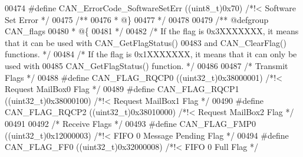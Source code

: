 \begin{DoxyCode}
00474 \textcolor{preprocessor}{#}\textcolor{preprocessor}{define} \textcolor{preprocessor}{CAN\_ErrorCode\_SoftwareSetErr}  \textcolor{preprocessor}{(}\textcolor{preprocessor}{(}\textcolor{preprocessor}{uint8\_t}\textcolor{preprocessor}{)}0x70\textcolor{preprocessor}{)} \textcolor{comment}{/*!< Software Set Error */}
00475 \textcolor{comment}{/**}
00476 \textcolor{comment}{  * @\}}
00477 \textcolor{comment}{  */}
00478 
00479 \textcolor{comment}{/** @defgroup CAN\_flags }
00480 \textcolor{comment}{  * @\{}
00481 \textcolor{comment}{  */}
00482 \textcolor{comment}{/* If the flag is 0x3XXXXXXX, it means that it can be used with CAN\_GetFlagStatus()}
00483 \textcolor{comment}{   and CAN\_ClearFlag() functions. */}
00484 \textcolor{comment}{/* If the flag is 0x1XXXXXXX, it means that it can only be used with }
00485 \textcolor{comment}{   CAN\_GetFlagStatus() function.  */}
00486 
00487 \textcolor{comment}{/* Transmit Flags */}
00488 \textcolor{preprocessor}{#}\textcolor{preprocessor}{define} \textcolor{preprocessor}{CAN\_FLAG\_RQCP0}             \textcolor{preprocessor}{(}\textcolor{preprocessor}{(}\textcolor{preprocessor}{uint32\_t}\textcolor{preprocessor}{)}0x38000001\textcolor{preprocessor}{)} \textcolor{comment}{/*!< Request MailBox0 Flag */}
00489 \textcolor{preprocessor}{#}\textcolor{preprocessor}{define} \textcolor{preprocessor}{CAN\_FLAG\_RQCP1}             \textcolor{preprocessor}{(}\textcolor{preprocessor}{(}\textcolor{preprocessor}{uint32\_t}\textcolor{preprocessor}{)}0x38000100\textcolor{preprocessor}{)} \textcolor{comment}{/*!< Request MailBox1 Flag */}
00490 \textcolor{preprocessor}{#}\textcolor{preprocessor}{define} \textcolor{preprocessor}{CAN\_FLAG\_RQCP2}             \textcolor{preprocessor}{(}\textcolor{preprocessor}{(}\textcolor{preprocessor}{uint32\_t}\textcolor{preprocessor}{)}0x38010000\textcolor{preprocessor}{)} \textcolor{comment}{/*!< Request MailBox2 Flag */}
00491 
00492 \textcolor{comment}{/* Receive Flags */}
00493 \textcolor{preprocessor}{#}\textcolor{preprocessor}{define} \textcolor{preprocessor}{CAN\_FLAG\_FMP0}              \textcolor{preprocessor}{(}\textcolor{preprocessor}{(}\textcolor{preprocessor}{uint32\_t}\textcolor{preprocessor}{)}0x12000003\textcolor{preprocessor}{)} \textcolor{comment}{/*!< FIFO 0 Message Pending Flag */}
00494 \textcolor{preprocessor}{#}\textcolor{preprocessor}{define} \textcolor{preprocessor}{CAN\_FLAG\_FF0}               \textcolor{preprocessor}{(}\textcolor{preprocessor}{(}\textcolor{preprocessor}{uint32\_t}\textcolor{preprocessor}{)}0x32000008\textcolor{preprocessor}{)} \textcolor{comment}{/*!< FIFO 0 Full Flag            */}

\end{DoxyCode}
